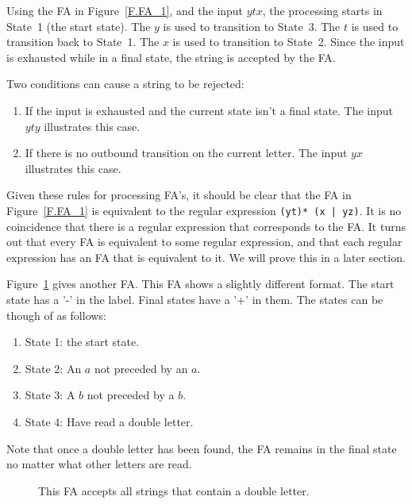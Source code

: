 \documentclass[letterpaper,12pt,openany,reqno]{book}%
\newcommand{\code}[1] {\lstinline[breaklines=yes,breakatwhitespace=yes]{#1}}
\newcommand{\fanonterminalnode}[2] {\node at (#1) (#2) [circle, draw, minimum size=24pt] {#2};}
\newcommand{\fatransition}[3] {\draw [-{Latex[length=3mm,width=2.5mm]}] (#1) -- (#2) node [midway, above] {#3};}
\newcommand{\faarctransition}[5] {\draw [-{Latex[length=3mm,width=2.5mm]}] (#1) to[out=#4, in=#5] node  [midway, above] {#3} (#2) ;}
\begin{document}
Using the FA in Figure~\ref{F.FA_1}, and the input $ytx$, the processing starts in State~1 (the start state). The $y$ is used to transition to State~3. The $t$ is used to transition back to State~1. The $x$ is used to transition to State~2. Since the input is exhausted while in a final state, the string is accepted by the FA.

Two conditions can cause a string to be rejected: 
\begin{enumerate}
\item If the input is exhausted and the current state isn't a final state. The input $yty$ illustrates this case.
\item If there is no outbound transition on the current letter. The input $yx$ illustrates this case.
\end{enumerate}

Given these rules for processing FA's, it should be clear that the FA in Figure~\ref{F.FA_1} is equivalent to the regular expression \code{(yt)* (x | yz)}. It is no coincidence that there is a regular expression that corresponds to the FA. It turns out that every FA is equivalent to some regular expression, and that each regular expression has an FA that is equivalent to it. We will prove this in a later section.

Figure~\ref{F.FA_2} gives another FA. This FA shows a slightly different format. The start state has a '-' in the label. Final states have a '$+$' in them. The states can be though of as follows:
\begin{enumerate}
\item State 1: the start state.
\item State 2: An $a$ not preceded by an $a$.
\item State 3: A $b$ not preceded by a $b$.
\item State 4: Have read a double letter.
\end{enumerate}
Note that once a double letter has been found, the FA remains in the final state no matter what other letters are read.

\begin{figure}[hbt]
\centering
{}
 \caption[FA for double letters]{This FA accepts all strings that contain a double letter.}
  \label{F.FA_2}
\end{figure}
\end{document}
